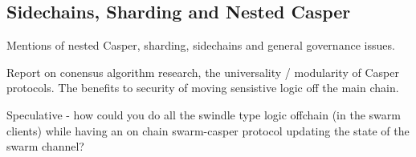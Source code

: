 \subsection{Sidechains, Sharding and Nested Casper}
Mentions of nested Casper, sharding, sidechains and general governance issues.

Report on conensus algorithm research, the universality / modularity of Casper protocols. The benefits to security of moving sensistive logic off the main chain.

Speculative - how could you do all the swindle type logic offchain (in the swarm clients) while having an on chain swarm-casper protocol updating the state of the swarm channel?